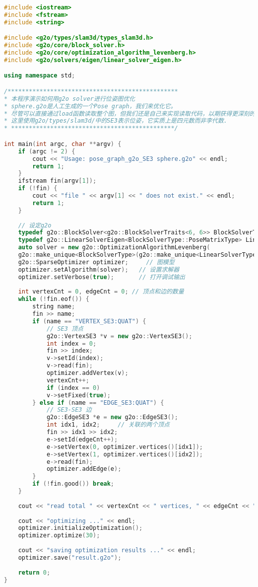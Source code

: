 \begin{lstlisting}[language=c++,caption=slambook2/ch10/pose\_graph\_g2o\_SE3.cpp]
#include <iostream>
#include <fstream>
#include <string>

#include <g2o/types/slam3d/types_slam3d.h>
#include <g2o/core/block_solver.h>
#include <g2o/core/optimization_algorithm_levenberg.h>
#include <g2o/solvers/eigen/linear_solver_eigen.h>

using namespace std;

/************************************************
* 本程序演示如何用g2o solver进行位姿图优化
* sphere.g2o是人工生成的一个Pose graph，我们来优化它。
* 尽管可以直接通过load函数读取整个图，但我们还是自己来实现读取代码，以期获得更深刻的理解
* 这里使用g2o/types/slam3d/中的SE3表示位姿，它实质上是四元数而非李代数.
* **********************************************/

int main(int argc, char **argv) {
    if (argc != 2) {
        cout << "Usage: pose_graph_g2o_SE3 sphere.g2o" << endl;
        return 1;
    }
    ifstream fin(argv[1]);
    if (!fin) {
        cout << "file " << argv[1] << " does not exist." << endl;
        return 1;
    }
    
    // 设定g2o
    typedef g2o::BlockSolver<g2o::BlockSolverTraits<6, 6>> BlockSolverType;
    typedef g2o::LinearSolverEigen<BlockSolverType::PoseMatrixType> LinearSolverType;
    auto solver = new g2o::OptimizationAlgorithmLevenberg(
    g2o::make_unique<BlockSolverType>(g2o::make_unique<LinearSolverType>()));
    g2o::SparseOptimizer optimizer;     // 图模型
    optimizer.setAlgorithm(solver);   // 设置求解器
    optimizer.setVerbose(true);       // 打开调试输出
    
    int vertexCnt = 0, edgeCnt = 0; // 顶点和边的数量
    while (!fin.eof()) {
        string name;
        fin >> name;
        if (name == "VERTEX_SE3:QUAT") {
            // SE3 顶点
            g2o::VertexSE3 *v = new g2o::VertexSE3();
            int index = 0;
            fin >> index;
            v->setId(index);
            v->read(fin);
            optimizer.addVertex(v);
            vertexCnt++;
            if (index == 0)
            v->setFixed(true);
        } else if (name == "EDGE_SE3:QUAT") {
            // SE3-SE3 边
            g2o::EdgeSE3 *e = new g2o::EdgeSE3();
            int idx1, idx2;     // 关联的两个顶点
            fin >> idx1 >> idx2;
            e->setId(edgeCnt++);
            e->setVertex(0, optimizer.vertices()[idx1]);
            e->setVertex(1, optimizer.vertices()[idx2]);
            e->read(fin);
            optimizer.addEdge(e);
        }
        if (!fin.good()) break;
    }
    
    cout << "read total " << vertexCnt << " vertices, " << edgeCnt << " edges." << endl;
    
    cout << "optimizing ..." << endl;
    optimizer.initializeOptimization();
    optimizer.optimize(30);
    
    cout << "saving optimization results ..." << endl;
    optimizer.save("result.g2o");
    
    return 0;
}
\end{lstlisting}


